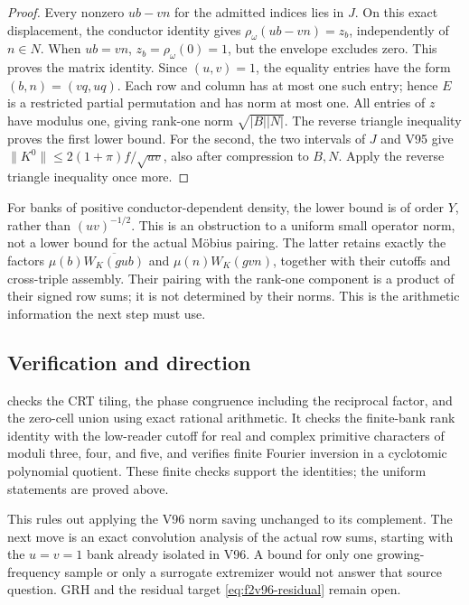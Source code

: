 \documentclass[11pt]{article}
\theoremstyle{definition}
\theoremstyle{remark}
\begin{document}
\begin{proof}
Every nonzero \(ub-vn\) for the admitted indices lies in \(J\).
On this exact displacement, the conductor identity gives
\(\rho_\omega(ub-vn)=z_b\), independently of \(n\in N\).
When \(ub=vn\), \(z_b=\rho_\omega(0)=1\), but the envelope
excludes zero.  This proves the matrix identity.  Since \((u,v)=1\),
the equality entries have the form \((b,n)=(vq,uq)\).  Each row and
column has at most one such entry; hence \(E\) is a restricted partial
permutation and has norm at most one.  All entries of \(z\) have
modulus one, giving rank-one norm \(\sqrt{|B||N|}\).
The reverse triangle inequality proves the first lower bound.
For the second, the two intervals of \(J\) and V95 give
\(\|K^0\|\le2(1+\pi)f/\sqrt{uv}\), also after compression to
\(B,N\).  Apply the reverse triangle inequality once more.
\end{proof}

For banks of positive conductor-dependent density, the lower bound is
of order \(Y\), rather than \((uv)^{-1/2}\).  This is an obstruction
to a uniform small operator norm, not a lower bound for the actual
M\"obius pairing.  The latter retains exactly the factors
\(\mu(b)\overline{W_K(gub)}\) and \(\mu(n)W_K(gvn)\), together
with their cutoffs and cross-triple assembly.  Their pairing with the
rank-one component is a product of their signed row sums; it is not
determined by their norms.  This is the arithmetic information the next
step must use.

\subsection*{Verification and direction}

 checks the CRT tiling,
the phase congruence including the reciprocal factor, and the zero-cell
union using exact rational arithmetic.  It checks the finite-bank
rank identity with the low-reader cutoff for real and complex primitive
characters of moduli three, four, and five, and verifies finite Fourier
inversion in a cyclotomic polynomial quotient.  These finite checks
support the identities; the uniform statements are proved above.

This rules out applying the V96 norm saving unchanged to its complement.
The next move is an exact convolution analysis of the actual row sums,
starting with the \(u=v=1\) bank already isolated in V96.  A bound for
only one growing-frequency sample or only a surrogate extremizer would
not answer that source question.  GRH and the residual target
\eqref{eq:f2v96-residual} remain open.
\end{document}
